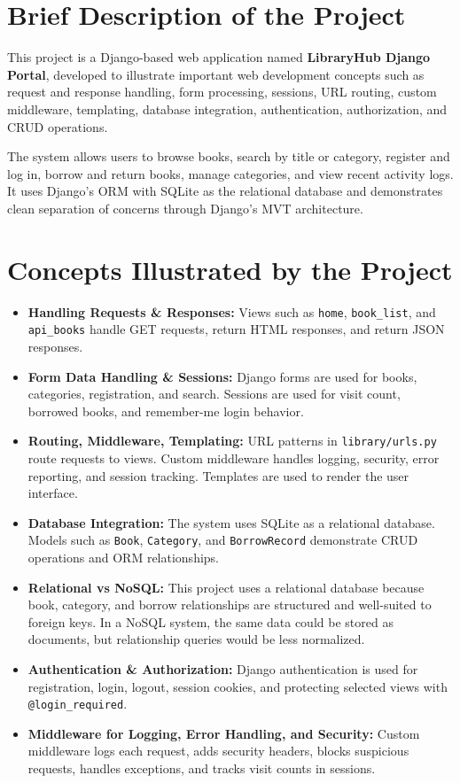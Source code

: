 \documentclass[12pt,a4paper]{article}
\begin{document}
\tableofcontents
\newpage

\section{Brief Description of the Project}
This project is a Django-based web application named \textbf{LibraryHub Django Portal}, developed to illustrate important web development concepts such as request and response handling, form processing, sessions, URL routing, custom middleware, templating, database integration, authentication, authorization, and CRUD operations.

The system allows users to browse books, search by title or category, register and log in, borrow and return books, manage categories, and view recent activity logs. It uses Django's ORM with SQLite as the relational database and demonstrates clean separation of concerns through Django's MVT architecture.

\section{Concepts Illustrated by the Project}
\begin{itemize}
    \item \textbf{Handling Requests \& Responses:} Views such as \texttt{home}, \texttt{book\_list}, and \texttt{api\_books} handle GET requests, return HTML responses, and return JSON responses.
    \item \textbf{Form Data Handling \& Sessions:} Django forms are used for books, categories, registration, and search. Sessions are used for visit count, borrowed books, and remember-me login behavior.
    \item \textbf{Routing, Middleware, Templating:} URL patterns in \texttt{library/urls.py} route requests to views. Custom middleware handles logging, security, error reporting, and session tracking. Templates are used to render the user interface.
    \item \textbf{Database Integration:} The system uses SQLite as a relational database. Models such as \texttt{Book}, \texttt{Category}, and \texttt{BorrowRecord} demonstrate CRUD operations and ORM relationships.
    \item \textbf{Relational vs NoSQL:} This project uses a relational database because book, category, and borrow relationships are structured and well-suited to foreign keys. In a NoSQL system, the same data could be stored as documents, but relationship queries would be less normalized.
    \item \textbf{Authentication \& Authorization:} Django authentication is used for registration, login, logout, session cookies, and protecting selected views with \texttt{@login\_required}.
    \item \textbf{Middleware for Logging, Error Handling, and Security:} Custom middleware logs each request, adds security headers, blocks suspicious requests, handles exceptions, and tracks visit counts in sessions.
\end{itemize}
\end{document}
